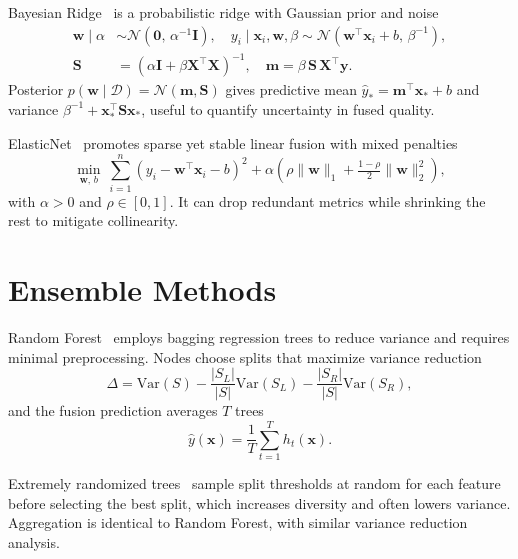 Bayesian Ridge~\cite{bayesianridge} is a probabilistic ridge with Gaussian prior and noise
\begin{align}
\mathbf{w}\mid\alpha &\sim \mathcal{N}(\mathbf{0},\,\alpha^{-1}\mathbf{I}), \quad
y_i\mid\mathbf{x}_i,\mathbf{w},\beta \sim \mathcal{N}(\mathbf{w}^{\top}\mathbf{x}_i+b,\,\beta^{-1}),\\
\mathbf{S} &= \left(\alpha\mathbf{I}+\beta \mathbf{X}^{\top}\mathbf{X}\right)^{-1},\quad
\mathbf{m}=\beta\,\mathbf{S}\,\mathbf{X}^{\top}\mathbf{y}.
\end{align}
Posterior \(p(\mathbf{w}\mid\mathcal{D})=\mathcal{N}(\mathbf{m},\mathbf{S})\) gives predictive mean \(\hat{y}_*=\mathbf{m}^{\top}\mathbf{x}_*+b\) and variance \(\beta^{-1}+\mathbf{x}_*^{\top}\mathbf{S}\mathbf{x}_*\), useful to quantify uncertainty in fused quality.

ElasticNet~\cite{elasticnet} promotes sparse yet stable linear fusion with mixed penalties
\begin{equation}
\min_{\mathbf{w},\,b}\ \sum_{i=1}^{n}\left(y_i-\mathbf{w}^{\top}\mathbf{x}_i-b\right)^2
+\alpha\left(\rho\|\mathbf{w}\|_{1}+\tfrac{1-\rho}{2}\|\mathbf{w}\|_{2}^{2}\right),
\end{equation}
with \(\alpha>0\) and \(\rho\in[0,1]\). It can drop redundant metrics while shrinking the rest to mitigate collinearity.

\section{Ensemble Methods}\label{sec:ensembles}

Random Forest~\cite{randomforest} employs bagging regression trees to reduce variance and requires minimal preprocessing. Nodes choose splits that maximize variance reduction
\begin{equation}
\Delta=\mathrm{Var}(S)-\frac{|S_L|}{|S|}\mathrm{Var}(S_L)-\frac{|S_R|}{|S|}\mathrm{Var}(S_R),
\end{equation}
and the fusion prediction averages \(T\) trees
\begin{equation}
\hat{y}(\mathbf{x})=\frac{1}{T}\sum_{t=1}^{T}h_t(\mathbf{x}).
\end{equation}

Extremely randomized trees~\cite{ensembles} sample split thresholds at random for each feature before selecting the best split, which increases diversity and often lowers variance. Aggregation is identical to Random Forest, with similar variance reduction analysis.

